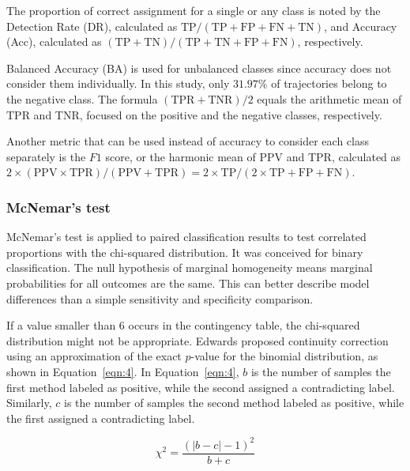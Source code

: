 \let\LaTeXcline\cline\documentclass[sn-mathphys-num]{sn-jnl}\let\cline\LaTeXcline
\begin{document}
The proportion of correct assignment for a single or any class is noted by the Detection Rate (DR), calculated as $\mathrm{TP}/(\mathrm{TP}+\mathrm{FP}+\mathrm{FN}+\mathrm{TN})$, and Accuracy (Acc), calculated as $(\mathrm{TP} + \mathrm{TN}) / (\mathrm{TP} + \mathrm{TN} + \mathrm{FP} + \mathrm{FN})$, respectively.

Balanced Accuracy (BA) \cite{velez2007balanced} is used for unbalanced classes since accuracy does not consider them individually. In this study, only $31.97\%$ of trajectories belong to the negative class. The formula $(\mathrm{TPR} + \mathrm{TNR}) / 2$ equals the arithmetic mean of TPR and TNR, focused on the positive and the negative classes, respectively.

Another metric that can be used instead of accuracy to consider each class separately is the $F1$ score, or the harmonic mean of PPV and TPR, calculated as $2 \times (\mathrm{PPV} \times \mathrm{TPR}) / (\mathrm{PPV} + \mathrm{TPR}) = 2 \times \mathrm{TP} / (2 \times \mathrm{TP} + \mathrm{FP} + \mathrm{FN})$.

\subsubsection{McNemar's test}

McNemar’s test is applied to paired classification results to test correlated proportions with the chi-squared distribution. It was conceived for binary classification. The null hypothesis of marginal homogeneity means marginal probabilities for all outcomes are the same. This can better describe model differences than a simple sensitivity and specificity comparison.

If a value smaller than $6$ occurs in the contingency table, the chi-squared distribution might not be appropriate. Edwards \cite{edwards1948note} proposed continuity correction using an approximation of the exact $p$-value for the binomial distribution, as shown in Equation~\ref{eqn:4}. In Equation~\ref{eqn:4}, $b$ is the number of samples the first method labeled as positive, while the second assigned a contradicting label. Similarly, $c$ is the number of samples the second method labeled as positive, while the first assigned a contradicting label.
 
\begin{equation}
    \chi^{2}=\frac{(|b-c|-1)^{2}}{b+c}
    \label{eqn:4}
\end{equation}
\end{document}
